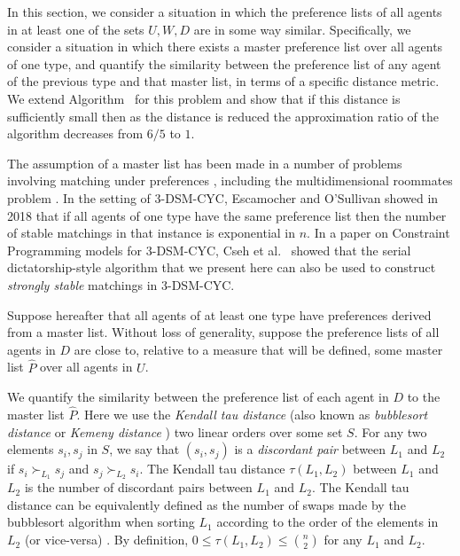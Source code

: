 In this section, we consider a situation in which the preference lists of all agents in at least one of the sets $U, W, D$ are in some way similar. Specifically, we consider a situation in which there exists a master preference list over all agents of one type, and quantify the similarity between the preference list of any agent of the previous type and that master list, in terms of a specific distance metric. We extend Algorithm~ for this problem and show that if this distance is sufficiently small then as the distance is reduced the approximation ratio of the algorithm decreases from $6/5$ to $1$.

The assumption of a master list has been made in a number of problems involving matching under preferences \cite{AMUP}, including the multidimensional roommates problem \cite{Bre20}. In the setting of 3-DSM-CYC, Escamocher and O'Sullivan \cite{Escamocher2018} showed in 2018 that if all agents of one type have the same preference list then the number of stable matchings in that instance is exponential in $n$. In a paper on Constraint Programming models for 3-DSM-CYC, Cseh et al.\ \cite{Cseh2022} showed that the serial dictatorship-style algorithm that we present here can also be used to construct \emph{strongly stable} matchings in 3-DSM-CYC.


Suppose hereafter that all agents of at least one type have preferences derived from a master list. Without loss of generality, suppose the preference lists of all agents in $D$ are close to, relative to a measure that will be defined, some master list $\hat{P}$ over all agents in $U$.

We quantify the similarity between the preference list of each agent in $D$ to the master list $\hat{P}$. Here we use the \emph{Kendall tau distance} \cite{KendallTauCitation} (also known as \emph{bubblesort distance} or \emph{Kemeny distance} \cite{HedonicGamesHOCSC}) two linear orders over some set $S$. For any two elements $s_i, s_j$ in $S$, we say that $(s_i, s_j)$ is a \emph{discordant pair} between $L_1$ and $L_2$ if $s_i \succ_{L_1} s_j$ and $s_j \succ_{L_2} s_i$. The Kendall tau distance $\tau(L_1, L_2)$ between $L_1$ and $L_2$ is the number of discordant pairs between $L_1$ and $L_2$. The Kendall tau distance can be equivalently defined as the number of swaps made by the bubblesort algorithm when sorting $L_1$ according to the order of the elements in $L_2$ (or vice-versa) \cite{KendallTauCitation}. By definition, $0 \leq \tau(L_1, L_2) \leq \binom{n}{2}$ for any $L_1$ and $L_2$.

